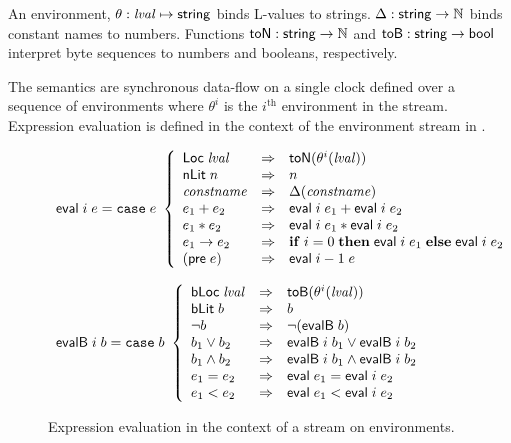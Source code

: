 An environment, $\theta: \mathit{lval} \mapsto \mathsf{string}$ binds L-values to strings. $\Delta : \mathsf{string} \to \mathbb{N}$ binds constant names to numbers. Functions $\mathsf{toN}:\mathsf{string}\to\mathbb{N}$ and $\mathsf{toB}:\mathsf{string}\to\mathsf{bool}$ interpret byte sequences to numbers and booleans, respectively. 

The semantics are synchronous data-flow on a single clock defined over a sequence of environments where $\theta^i$ is the $i^\mathrm{th}$ environment in the stream. Expression evaluation is defined in the context of the environment stream in .

\begin{figure*}
\[
\begin{array}{l}
\mathsf{eval}\; i\; e =
\mathtt{case}\; e\
 \left\{
 \begin{array}{lcl}
    \mathsf{Loc}\; \mathit{lval} & \Rightarrow & \mathsf{toN}(\theta^i(\mathit{lval})) \\
    \mathsf{nLit}\; n & \Rightarrow & n  \\
    \mathit{constname} & \Rightarrow & \Delta(\mathit{constname})  \\
    e_1 + e_2 & \Rightarrow & \mathsf{eval}\; i \; e_1 + \mathsf{eval}\; i \; e_2  \\
    e_1 * e_2 & \Rightarrow & \mathsf{eval}\; i \; e_1 * \mathsf{eval}\; i \; e_2  \\
    e_1 \rightarrow e_2 & \Rightarrow &  \mathbf{if}\; i = 0\; \mathbf{then}\; \mathsf{eval}\; i \; e_1\; 
                                         \mathbf{else}\; \mathsf{eval}\; i \; e_2 \\
    (\mathsf{pre}\; e) & \Rightarrow &  \mathsf{eval}\; i-1 \; e
  \end{array}
 \right.
 \\ \\
\mathsf{evalB}\; i \; b =
\mathtt{case}\; b\
 \left\{
 \begin{array}{lcl}
    \mathsf{bLoc}\; \mathit{lval} & \Rightarrow & \mathsf{toB}(\theta^i(\mathit{lval})) \\
    \mathsf{bLit}\; b & \Rightarrow & b \\
    \neg b & \Rightarrow & \neg(\mathsf{evalB} \; b)  \\
    b_1 \lor b_2 & \Rightarrow & \mathsf{evalB}\; i \;b_1 \lor \mathsf{evalB}\; i \;b_2   \\
    b_1 \land b_2 & \Rightarrow & \mathsf{evalB}\; i \;b_1 \land \mathsf{evalB}\; i \;b_2   \\
    e_1 = e_2 & \Rightarrow & \mathsf{eval} \;e_1 = \mathsf{eval}\; i \;e_2   \\
    e_1 < e_2 & \Rightarrow & \mathsf{eval} \;e_1 < \mathsf{eval}\; i \;e_2
  \end{array}
 \right.
\end{array}
\]
\caption{Expression evaluation in the context of a stream on environments.}
\label{fig:eval}
\end{figure*}

